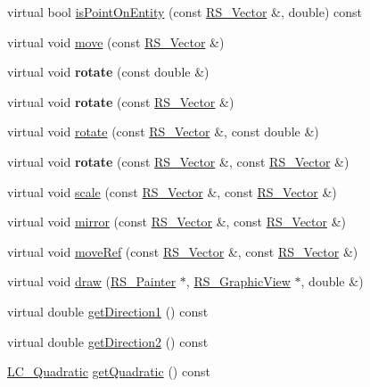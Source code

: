 \begin{DoxyCompactItemize}
\item 
virtual bool \hyperlink{classLC__Hyperbola_ac29ca1b8803e2f20374580a3d7ac4ee4}{is\-Point\-On\-Entity} (const \hyperlink{classRS__Vector}{R\-S\-\_\-\-Vector} \&, double) const 
\item 
virtual void \hyperlink{classLC__Hyperbola_aecfb88b8b9298d371c9695acea70f8e4}{move} (const \hyperlink{classRS__Vector}{R\-S\-\_\-\-Vector} \&)
\item 
\hypertarget{classLC__Hyperbola_a74f714f64ec4f73affe6078ec26b5a38}{virtual void {\bfseries rotate} (const double \&)}\label{classLC__Hyperbola_a74f714f64ec4f73affe6078ec26b5a38}

\item 
\hypertarget{classLC__Hyperbola_ac98a496917aeee10208b2345c37bc0c1}{virtual void {\bfseries rotate} (const \hyperlink{classRS__Vector}{R\-S\-\_\-\-Vector} \&)}\label{classLC__Hyperbola_ac98a496917aeee10208b2345c37bc0c1}

\item 
virtual void \hyperlink{classLC__Hyperbola_a49e84ac700039e690cbe2e71c283db33}{rotate} (const \hyperlink{classRS__Vector}{R\-S\-\_\-\-Vector} \&, const double \&)
\item 
\hypertarget{classLC__Hyperbola_ab4ef54094e1877cc92cc4006c79e1a1c}{virtual void {\bfseries rotate} (const \hyperlink{classRS__Vector}{R\-S\-\_\-\-Vector} \&, const \hyperlink{classRS__Vector}{R\-S\-\_\-\-Vector} \&)}\label{classLC__Hyperbola_ab4ef54094e1877cc92cc4006c79e1a1c}

\item 
virtual void \hyperlink{classLC__Hyperbola_a57405ef6f99953d9b835fd028b95126e}{scale} (const \hyperlink{classRS__Vector}{R\-S\-\_\-\-Vector} \&, const \hyperlink{classRS__Vector}{R\-S\-\_\-\-Vector} \&)
\item 
virtual void \hyperlink{classLC__Hyperbola_a5d768d053dc10adae85619caae5e1417}{mirror} (const \hyperlink{classRS__Vector}{R\-S\-\_\-\-Vector} \&, const \hyperlink{classRS__Vector}{R\-S\-\_\-\-Vector} \&)
\item 
virtual void \hyperlink{classLC__Hyperbola_aeacd2a969e9cf7259440d56a541ee94d}{move\-Ref} (const \hyperlink{classRS__Vector}{R\-S\-\_\-\-Vector} \&, const \hyperlink{classRS__Vector}{R\-S\-\_\-\-Vector} \&)
\item 
virtual void \hyperlink{classLC__Hyperbola_add3e4cf21dfbc20c65b38d29fb865a14}{draw} (\hyperlink{classRS__Painter}{R\-S\-\_\-\-Painter} $\ast$, \hyperlink{classRS__GraphicView}{R\-S\-\_\-\-Graphic\-View} $\ast$, double \&)
\item 
virtual double \hyperlink{classLC__Hyperbola_a4f608b3a55ffebd6575220837c36d3a7}{get\-Direction1} () const 
\item 
virtual double \hyperlink{classLC__Hyperbola_ac492b53db964741abe9750f0b1966803}{get\-Direction2} () const 
\item 
\hyperlink{classLC__Quadratic}{L\-C\-\_\-\-Quadratic} \hyperlink{classLC__Hyperbola_a286e2e6848ed5ff7774b79967dd17aa7}{get\-Quadratic} () const 
\end{DoxyCompactItemize}
